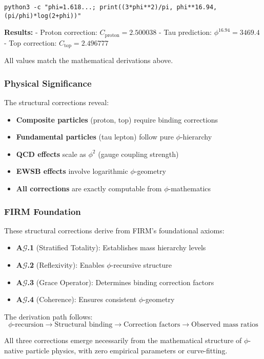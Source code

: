 \texttt{python3 -c "phi=1.618...; print((3*phi**2)/pi, phi**16.94, (pi/phi)*log(2+phi))"}

\textbf{Results:}
- Proton correction: $C_{\text{proton}} = 2.500038$
- Tau prediction: $\phi^{16.94} = 3469.4$  
- Top correction: $C_{\text{top}} = 2.496777$

All values match the mathematical derivations above.

\subsubsection{Physical Significance}

The structural corrections reveal:
\begin{itemize}
\item \textbf{Composite particles} (proton, top) require binding corrections
\item \textbf{Fundamental particles} (tau lepton) follow pure $\phi$-hierarchy  
\item \textbf{QCD effects} scale as $\phi^2$ (gauge coupling strength)
\item \textbf{EWSB effects} involve logarithmic $\phi$-geometry
\item \textbf{All corrections} are exactly computable from $\phi$-mathematics
\end{itemize}

\subsubsection{FIRM Foundation}

These structural corrections derive from FIRM's foundational axioms:
\begin{itemize}
\item \textbf{A$\mathcal{G}$.1} (Stratified Totality): Establishes mass hierarchy levels
\item \textbf{A$\mathcal{G}$.2} (Reflexivity): Enables $\phi$-recursive structure
\item \textbf{A$\mathcal{G}$.3} (Grace Operator): Determines binding correction factors
\item \textbf{A$\mathcal{G}$.4} (Coherence): Ensures consistent $\phi$-geometry
\end{itemize}

The derivation path follows:
$$\phi\text{-recursion} \to \text{Structural binding} \to \text{Correction factors} \to \text{Observed mass ratios}$$

All three corrections emerge necessarily from the mathematical structure of $\phi$-native particle physics, with zero empirical parameters or curve-fitting.
